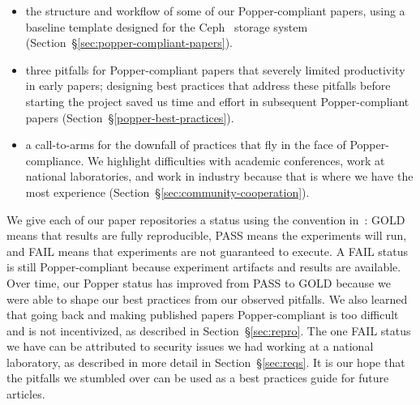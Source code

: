 \begin{itemize}

  \item the structure and workflow of some of our Popper-compliant papers,
using a baseline template designed for the Ceph~\cite{weil:osdi2006-ceph}
storage system (Section~\S\ref{sec:popper-compliant-papers}).

  \item three pitfalls for Popper-compliant papers that severely limited
productivity in early papers; designing best practices that address these
pitfalls before starting the project saved us time and effort in subsequent
Popper-compliant papers (Section~\S\ref{popper-best-practices}).

  \item a call-to-arms for the downfall of practices that fly in the face of
Popper-compliance. We highlight difficulties with academic conferences, work at
national laboratories, and work in industry because that is where we have the
most experience (Section~\S\ref{sec:community-cooperation}).

\end{itemize}

We give each of our paper repositories a status using the convention
in~\cite{jimenez:rr18-popper}: GOLD means that results are fully reproducible,
PASS means the experiments will run, and FAIL means that experiments are not
guaranteed to execute. A FAIL status is still Popper-compliant because
experiment artifacts and results are available.  Over time, our Popper status
has improved from PASS to GOLD because we were able to shape our best practices
from our observed pitfalls. We also learned that going back and making
published papers Popper-compliant is too difficult and is not incentivized, as
described in Section~\S\ref{sec:repro}. The one FAIL status we have can be
attributed to security issues we had working at a national laboratory, as
described in more detail in Section~\S\ref{sec:reqs}. It is our hope that the
pitfalls we stumbled over can be used as a best practices guide for future
articles.

